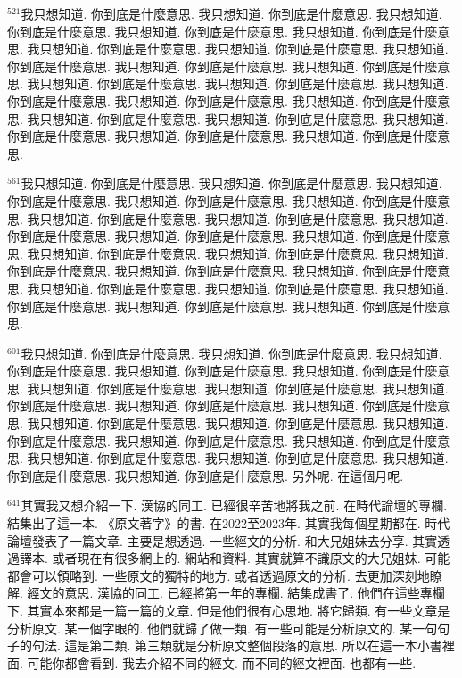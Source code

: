 \documentclass{book}
\begin{document}
$^{521}$我只想知道.
你到底是什麼意思.
我只想知道.
你到底是什麼意思.
我只想知道.
你到底是什麼意思.
我只想知道.
你到底是什麼意思.
我只想知道.
你到底是什麼意思.
我只想知道.
你到底是什麼意思.
我只想知道.
你到底是什麼意思.
我只想知道.
你到底是什麼意思.
我只想知道.
你到底是什麼意思.
我只想知道.
你到底是什麼意思.
我只想知道.
你到底是什麼意思.
我只想知道.
你到底是什麼意思.
我只想知道.
你到底是什麼意思.
我只想知道.
你到底是什麼意思.
我只想知道.
你到底是什麼意思.
我只想知道.
你到底是什麼意思.
我只想知道.
你到底是什麼意思.
我只想知道.
你到底是什麼意思.
我只想知道.
你到底是什麼意思.
我只想知道.
你到底是什麼意思.

$^{561}$我只想知道.
你到底是什麼意思.
我只想知道.
你到底是什麼意思.
我只想知道.
你到底是什麼意思.
我只想知道.
你到底是什麼意思.
我只想知道.
你到底是什麼意思.
我只想知道.
你到底是什麼意思.
我只想知道.
你到底是什麼意思.
我只想知道.
你到底是什麼意思.
我只想知道.
你到底是什麼意思.
我只想知道.
你到底是什麼意思.
我只想知道.
你到底是什麼意思.
我只想知道.
你到底是什麼意思.
我只想知道.
你到底是什麼意思.
我只想知道.
你到底是什麼意思.
我只想知道.
你到底是什麼意思.
我只想知道.
你到底是什麼意思.
我只想知道.
你到底是什麼意思.
我只想知道.
你到底是什麼意思.
我只想知道.
你到底是什麼意思.
我只想知道.
你到底是什麼意思.

$^{601}$我只想知道.
你到底是什麼意思.
我只想知道.
你到底是什麼意思.
我只想知道.
你到底是什麼意思.
我只想知道.
你到底是什麼意思.
我只想知道.
你到底是什麼意思.
我只想知道.
你到底是什麼意思.
我只想知道.
你到底是什麼意思.
我只想知道.
你到底是什麼意思.
我只想知道.
你到底是什麼意思.
我只想知道.
你到底是什麼意思.
我只想知道.
你到底是什麼意思.
我只想知道.
你到底是什麼意思.
我只想知道.
你到底是什麼意思.
我只想知道.
你到底是什麼意思.
我只想知道.
你到底是什麼意思.
我只想知道.
你到底是什麼意思.
我只想知道.
你到底是什麼意思.
我只想知道.
你到底是什麼意思.
我只想知道.
你到底是什麼意思.
另外呢.
在這個月呢.

$^{641}$其實我又想介紹一下.
漢協的同工.
已經很辛苦地將我之前.
在時代論壇的專欄.
結集出了這一本.
《原文著字》的書.
在2022至2023年.
其實我每個星期都在.
時代論壇發表了一篇文章.
主要是想透過.
一些經文的分析.
和大兄姐妹去分享.
其實透過譯本.
或者現在有很多網上的.
網站和資料.
其實就算不識原文的大兄姐妹.
可能都會可以領略到.
一些原文的獨特的地方.
或者透過原文的分析.
去更加深刻地瞭解.
經文的意思.
漢協的同工.
已經將第一年的專欄.
結集成書了.
他們在這些專欄下.
其實本來都是一篇一篇的文章.
但是他們很有心思地.
將它歸類.
有一些文章是分析原文.
某一個字眼的.
他們就歸了做一類.
有一些可能是分析原文的.
某一句句子的句法.
這是第二類.
第三類就是分析原文整個段落的意思.
所以在這一本小書裡面.
可能你都會看到.
我去介紹不同的經文.
而不同的經文裡面.
也都有一些.
\end{document}

